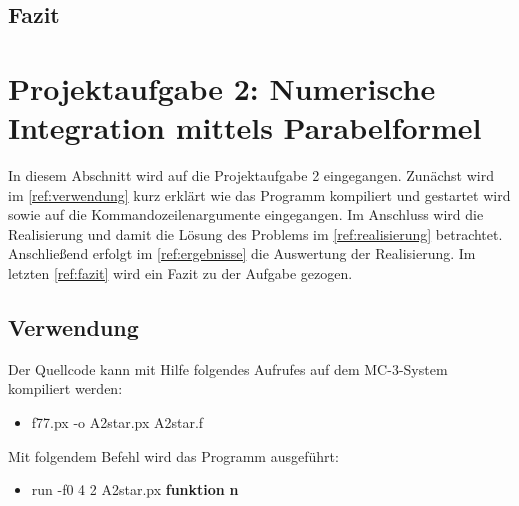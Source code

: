 \subsection{Fazit}

\pagebreak

\section{Projektaufgabe 2: Numerische Integration mittels Parabelformel}
\lstset{language=Fortran,frame=none, keepspaces=false, basicstyle=\footnotesize,showstringspaces=false}  
In diesem Abschnitt wird auf die Projektaufgabe 2 eingegangen.
Zunächst wird im \autoref{ref:verwendung} kurz erklärt wie das Programm kompiliert und gestartet wird sowie auf die Kommandozeilenargumente eingegangen.
Im Anschluss wird die Realisierung und damit die Lösung des Problems im \autoref{ref:realisierung} betrachtet.
Anschließend erfolgt im \autoref{ref:ergebnisse} die Auswertung der Realisierung.
Im letzten \autoref{ref:fazit} wird ein Fazit zu der Aufgabe gezogen.

\subsection{Verwendung}
\label{ref:verwendung}
Der Quellcode kann mit Hilfe folgendes Aufrufes auf dem MC-3-System kompiliert werden:
\begin{itemize}
	\item f77.px -o A2star.px A2star.f
\end{itemize}
Mit folgendem Befehl wird das Programm ausgeführt:
\begin{itemize}
	\item run -f0 4 2 A2star.px \textbf{funktion} \textbf{n}
\end{itemize}

